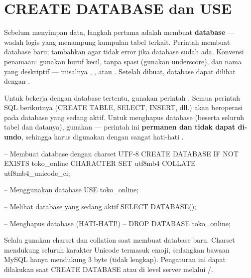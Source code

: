 \section{CREATE DATABASE dan USE}

Sebelum menyimpan data, langkah pertama adalah membuat \textbf{database} --- wadah logis yang menampung kumpulan tabel terkait. Perintah  membuat database baru; tambahkan  agar tidak error jika database sudah ada. Konvensi penamaan: gunakan huruf kecil, tanpa spasi (gunakan underscore), dan nama yang deskriptif --- misalnya , , atau . Setelah dibuat, database dapat dilihat dengan  \cite{mysqlDocs}.

Untuk bekerja dengan database tertentu, gunakan perintah . Semua perintah SQL berikutnya (CREATE TABLE, SELECT, INSERT, dll.) akan beroperasi pada database yang sedang aktif. Untuk menghapus database (beserta seluruh tabel dan datanya), gunakan  --- perintah ini \textbf{permanen dan tidak dapat di-undo}, sehingga harus digunakan dengan sangat hati-hati \cite{mysqlGettingStarted}.

\begin{webcode}[language=SQL, caption={Membuat dan menggunakan database}]
-- Membuat database dengan charset UTF-8
CREATE DATABASE IF NOT EXISTS toko_online
  CHARACTER SET utf8mb4
  COLLATE utf8mb4_unicode_ci;

-- Menggunakan database
USE toko_online;

-- Melihat database yang sedang aktif
SELECT DATABASE();

-- Menghapus database (HATI-HATI!)
-- DROP DATABASE toko_online;
\end{webcode}

\begin{catatan}
Selalu gunakan charset  dan collation  saat membuat database baru. Charset  mendukung seluruh karakter Unicode termasuk emoji, sedangkan  bawaan MySQL hanya mendukung 3 byte (tidak lengkap). Pengaturan ini dapat dilakukan saat CREATE DATABASE atau di level server melalui /.
\end{catatan}

